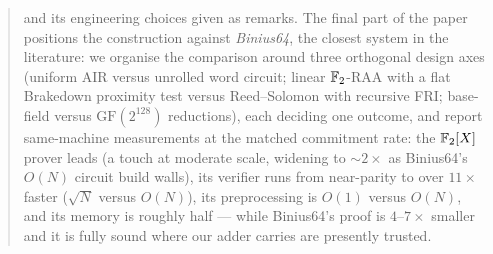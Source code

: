 \documentclass[11pt]{article}
\begin{document}
\begin{abstract}
and its engineering choices given as remarks. The final part of the paper
positions the construction against \emph{Binius64}, the closest system in
the literature: we organise the comparison around three orthogonal design
axes (uniform AIR versus unrolled word circuit; linear $\Ftwo$-RAA with a
flat Brakedown proximity test versus Reed--Solomon with recursive FRI;
base-field versus $\mathrm{GF}(2^{128})$ reductions), each deciding one
outcome, and report same-machine measurements at the matched commitment
rate: the $\Ftwo[X]$ prover leads (a touch at moderate scale, widening to
$\sim$$2\times$ as Binius64's $O(N)$ circuit build walls), its verifier
runs from near-parity to over $11\times$ faster ($\sqrt N$ versus $O(N)$),
its preprocessing is $O(1)$ versus $O(N)$, and its memory is roughly half
--- while Binius64's proof is $4$--$7\times$ smaller and it is fully sound
where our adder carries are presently trusted.
\end{abstract}

\tableofcontents







\appendix


\end{document}
